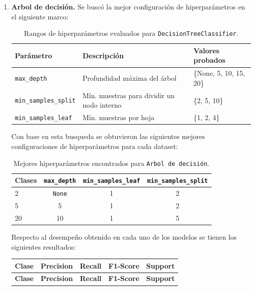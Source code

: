 \documentclass[12pt,a4paper]{article}
\begin{document}
\begin{enumerate}
  \item \textbf{Arbol de decisión.}
  Se buscó la mejor configuración de hiperparámetros en el siguiente marco:
  \begin{table}[htbp]
    \centering
    \begin{tabular}{@{}lll@{}}
      \toprule
      \textbf{Parámetro} & \textbf{Descripción} & \textbf{Valores probados} \\
      \midrule
      \texttt{max\_depth} & Profundidad máxima del árbol & \{None, 5, 10, 15, 20\} \\
      \texttt{min\_samples\_split} & Mín. muestras para dividir un nodo interno & \{2, 5, 10\} \\
      \texttt{min\_samples\_leaf} & Mín. muestras por hoja & \{1, 2, 4\} \\
      \bottomrule
    \end{tabular}
    \caption{Rangos de hiperparámetros evaluados para \texttt{DecisionTreeClassifier}.}
    \label{tab:param_dt_ranges}
  \end{table}

  Con base en esta busqueda se obtuvieron las siguientes mejores configuraciones de hiperparámetros para cada dataset:

  \begin{table}[htbp]
    \centering
    \begin{tabular}{@{}lccc@{}}
      \toprule
      \textbf{Clases} & \texttt{max\_depth} & \texttt{min\_samples\_leaf} & \texttt{min\_samples\_split} \\
      \midrule
      2  & \texttt{None} & 1 & 2 \\
      5  & 5              & 1 & 2 \\
      20 & 10             & 1 & 5 \\
      \bottomrule
    \end{tabular}
    \caption{Mejores hiperparámetros encontrados para \texttt{Arbol de decisión}.}
    \label{tab:best_hparams_dt}
  \end{table}

  Respecto al desempeño obtenido en cada uno de los modelos se tienen los siguientes resultados:

  \small
  \setlength{\tabcolsep}{4pt}
  \begin{longtable}{@{}lcccc@{}}
    \toprule
    \textbf{Clase} & \textbf{Precision} & \textbf{Recall} & \textbf{F1-Score} & \textbf{Support} \\
    \midrule
    \endfirsthead

    \toprule
    \textbf{Clase} & \textbf{Precision} & \textbf{Recall} & \textbf{F1-Score} & \textbf{Support} \\
    \midrule
    \endhead


\end{longtable}
\end{enumerate}
\end{document}
